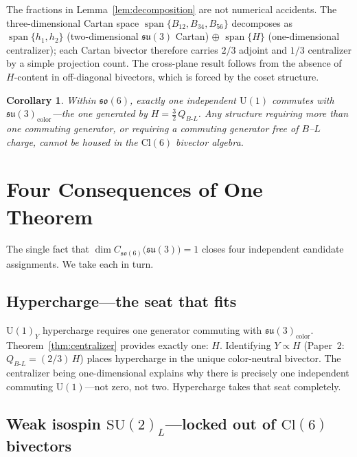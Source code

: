 \documentclass[aip,jmp,amsmath,amssymb,reprint,author-year]{revtex4-2}
\newtheorem{corollary}[theorem]{Corollary}
\begin{document}
The fractions in Lemma~\ref{lem:decomposition} are not numerical
accidents.  The three-dimensional Cartan space
$\operatorname{span}\{B_{12}, B_{34}, B_{56}\}$ decomposes as
$\operatorname{span}\{h_1, h_2\}$ (two-dimensional $\mathfrak{su}(3)$
Cartan) $\oplus$ $\operatorname{span}\{H\}$ (one-dimensional
centralizer); each Cartan bivector therefore carries $2/3$ adjoint and
$1/3$ centralizer by a simple projection count.  The cross-plane result
follows from the absence of $H$-content in off-diagonal bivectors, which
is forced by the coset structure.

\begin{corollary}
\label{cor:uniqueU1}
Within $\mathfrak{so}(6)$, exactly one independent $\mathrm{U}(1)$
commutes with $\mathfrak{su}(3)_{\mathrm{color}}$---the one generated by
$H = \tfrac{3}{2}\,Q_{B\text{-}L}$.  Any structure requiring more than
one commuting generator, or requiring a commuting generator free of
$B$--$L$ charge, cannot be housed in the $\mathrm{Cl}(6)$ bivector
algebra.
\end{corollary}

\section{Four Consequences of One Theorem}
\label{sec:consequences}

The single fact that
$\dim C_{\mathfrak{so}(6)}\!\bigl(\mathfrak{su}(3)\bigr) = 1$ closes
four independent candidate assignments.  We take each in turn.

\subsection{Hypercharge---the seat that fits}

$\mathrm{U}(1)_Y$ hypercharge requires one generator commuting with
$\mathfrak{su}(3)_{\mathrm{color}}$.
Theorem~\ref{thm:centralizer} provides exactly one: $H$.  Identifying
$Y \propto H$ (Paper~2: $Q_{B\text{-}L} = (2/3)\,H$) places hypercharge
in the unique color-neutral bivector.  The centralizer being
one-dimensional explains why there is precisely one independent commuting
$\mathrm{U}(1)$---not zero, not two.  Hypercharge takes that seat
completely.

\subsection{Weak isospin $\mathrm{SU}(2)_L$---locked out of $\mathrm{Cl}(6)$ bivectors}
\end{document}
